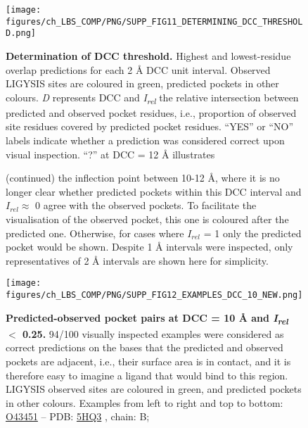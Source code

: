 \begin{figure}
    \centering
    \texttt{[image: figures/ch\_LBS\_COMP/PNG/SUPP\_FIG11\_DETERMINING\_DCC\_THRESHOLD.png]}
    
    \caption[Determination of DCC threshold]{\textbf{Determination of DCC threshold.} Highest and lowest-residue overlap predictions for each 2 \AA{} DCC unit interval. Observed LIGYSIS sites are coloured in green, predicted pockets in other colours. \textit{D} represents DCC and \textit{I\textsubscript{rel}} the relative intersection between predicted and observed pocket residues, i.e., proportion of observed site residues covered by predicted pocket residues. ``YES'' or ``NO'' labels indicate whether a prediction was considered correct upon visual inspection. ``?'' at DCC = 12 \AA{} illustrates}
    \label{fig:DCC_determination}
\end{figure}

\begin{figure}[ht]
\ContinuedFloat
\caption*{(continued) the inflection point between 10-12 \AA{}, where it is no longer clear whether predicted pockets within this DCC interval and $I_{rel} \approx$ 0 agree with the observed pockets. To facilitate the visualisation of the observed pocket, this one is coloured after the predicted one. Otherwise, for cases where $I_{rel}$ = 1 only the predicted pocket would be shown. Despite 1 \AA{} intervals were inspected, only representatives of 2 \AA{} intervals are shown here for simplicity.}
\end{figure}
\FloatBarrier

\begin{figure}[ht!]
    \centering
    \texttt{[image: figures/ch\_LBS\_COMP/PNG/SUPP\_FIG12\_EXAMPLES\_DCC\_10\_NEW.png]}
    \caption[Predicted-observed pocket pairs at DCC = 10 \AA{} and \textit{I\textsubscript{rel}} $<$ 0.25]{\textbf{Predicted-observed pocket pairs at DCC = 10 \AA{} and \textit{I\textsubscript{rel}} $<$ 0.25.} 94/100 visually inspected examples were considered as correct predictions on the bases that the predicted and observed pockets are adjacent, i.e., their surface area is in contact, and it is therefore easy to imagine a ligand that would bind to this region. LIGYSIS observed sites are coloured in green, and predicted pockets in other colours. Examples from left to right and top to bottom: \href{https://www.uniprot.org/uniprotkb/O43451/entry}{O43451} -- PDB: \href{https://www.ebi.ac.uk/pdbe/entry/pdb/5HQ3}{5HQ3} \cite{REN_2011_MALTASE}, chain: B;}
    \label{fig:DCC_10_examples}
\end{figure}
\FloatBarrier

